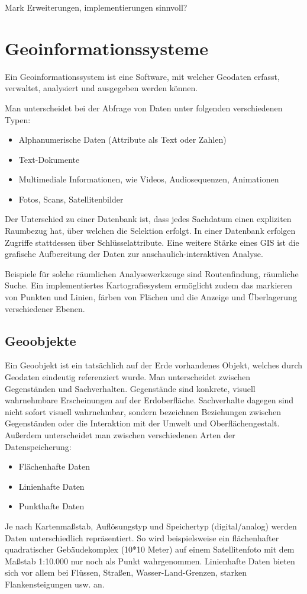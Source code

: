 \documentclass[11pt,fleqn]{book}
\begin{document}
Mark Erweiterungen, implementierungen sinnvoll?

\section{Geoinformationssysteme}
Ein Geoinformationssystem ist eine Software, mit welcher Geodaten erfasst, verwaltet, analysiert und ausgegeben werden können.

Man unterscheidet bei der Abfrage von Daten unter folgenden verschiedenen Typen:
\begin{itemize}
\item Alphanumerische Daten (Attribute als Text oder Zahlen)
\item Text-Dokumente 
\item Multimediale Informationen, wie Videos, Audiosequenzen, Animationen 
\item Fotos, Scans, Satellitenbilder
\end{itemize}

Der Unterschied zu einer Datenbank ist, dass jedes Sachdatum einen expliziten Raumbezug hat, über welchen die Selektion erfolgt. In einer Datenbank erfolgen Zugriffe stattdessen über Schlüsselattribute. Eine weitere Stärke eines GIS ist die grafische Aufbereitung der Daten zur anschaulich-interaktiven Analyse.

Beispiele für solche räumlichen Analysewerkzeuge sind Routenfindung, räumliche Suche. Ein implementiertes Kartografiesystem ermöglicht zudem das markieren von Punkten und Linien, färben von Flächen und die Anzeige und Überlagerung verschiedener Ebenen.

\subsection{Geoobjekte}
Ein Geoobjekt ist ein tatsächlich auf der Erde vorhandenes Objekt, welches durch Geodaten eindeutig referenziert wurde. Man unterscheidet zwischen Gegenständen und Sachverhalten. Gegenstände sind konkrete, visuell wahrnehmbare Erscheinungen auf der Erdoberfläche. Sachverhalte dagegen sind nicht sofort visuell wahrnehmbar, sondern bezeichnen Beziehungen zwischen Gegenständen oder die Interaktion mit der Umwelt und Oberflächengestalt.
Außerdem unterscheidet man zwischen verschiedenen Arten der Datenspeicherung:
\begin{itemize}
\item Flächenhafte Daten
\item Linienhafte Daten
\item Punkthafte Daten
\end{itemize}
Je nach Kartenmaßstab, Auflösungstyp und Speichertyp (digital/analog) werden Daten unterschiedlich repräsentiert. So wird beispielsweise ein flächenhafter quadratischer Gebäudekomplex (10*10 Meter) auf einem Satellitenfoto mit dem Maßstab 1:10.000 nur noch als Punkt wahrgenommen. Linienhafte Daten bieten sich vor allem bei Flüssen, Straßen, Wasser-Land-Grenzen, starken Flankensteigungen usw. an.
\end{document}
